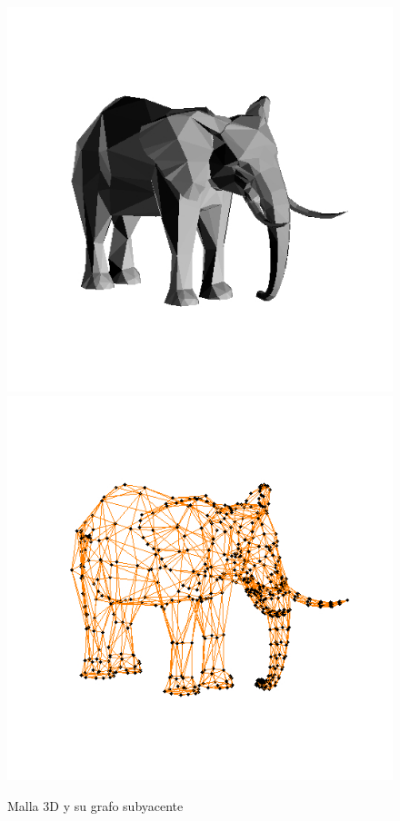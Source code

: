 \documentclass[conference,compsoc,a4paper]{IEEEtran}
\begin{document}
\begin{figure}
	\includegraphics[scale=.21]{elephav_solid.jpg} %
	\includegraphics[scale=.21]{elephav_graph.jpg} %
	\caption{Malla 3D y su grafo subyacente}%
	\label{fig:elephant} %
\end{figure}
\end{document}
